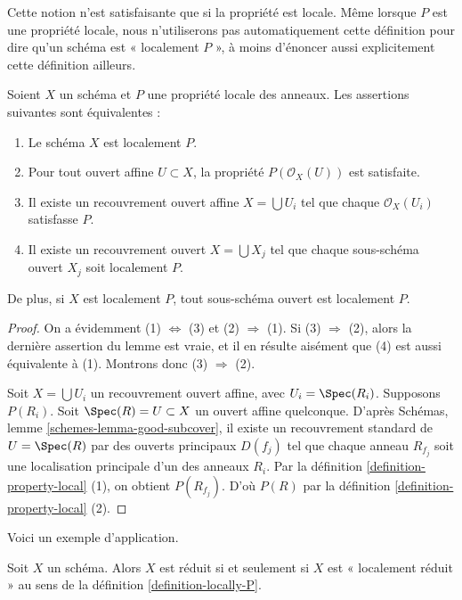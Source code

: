 \noindent
Cette notion n'est satisfaisante que si la propriété est locale.
Même lorsque $P$ est une propriété locale, nous n'utiliserons pas
automatiquement cette définition pour dire qu'un schéma est
« localement $P$ », à moins d'énoncer aussi explicitement cette définition
ailleurs.

\begin{lemma}
\label{lemma-locally-P}
Soient $X$ un schéma et $P$ une propriété locale des anneaux.
Les assertions suivantes sont équivalentes :
\begin{enumerate}
\item Le schéma $X$ est localement $P$.
\item Pour tout ouvert affine $U \subset X$, la propriété
$P(\mathcal{O}_X(U))$ est satisfaite.
\item Il existe un recouvrement ouvert affine $X = \bigcup U_i$ tel que
chaque $\mathcal{O}_X(U_i)$ satisfasse $P$.
\item Il existe un recouvrement ouvert $X = \bigcup X_j$
tel que chaque sous-schéma ouvert $X_j$ soit localement $P$.
\end{enumerate}
De plus, si $X$ est localement $P$, tout sous-schéma ouvert
est localement $P$.
\end{lemma}

\begin{proof}
On a évidemment (1) $\Leftrightarrow$ (3) et (2) $\Rightarrow$ (1).
Si (3) $\Rightarrow$ (2), alors la dernière assertion du lemme
est vraie, et il en résulte aisément que (4) est aussi équivalente à (1).
Montrons donc (3) $\Rightarrow$ (2).

\medskip\noindent
Soit $X = \bigcup U_i$ un recouvrement ouvert affine, avec
$U_i = \Spec(R_i)$. Supposons $P(R_i)$.
Soit $\Spec(R) = U \subset X$ un ouvert affine quelconque.
D'après Schémas, lemme \ref{schemes-lemma-good-subcover},
il existe un recouvrement standard de $U = \Spec(R)$ par des
ouverts principaux $D(f_j)$ tel que chaque anneau $R_{f_j}$ soit une
localisation principale d'un des anneaux $R_i$. Par la
définition \ref{definition-property-local} (1), on obtient $P(R_{f_j})$.
D'où $P(R)$ par la définition \ref{definition-property-local} (2).
\end{proof}

\noindent
Voici un exemple d'application.

\begin{lemma}
\label{lemma-reduced-is-locally-reduced}
Soit $X$ un schéma. Alors $X$ est réduit si et seulement si $X$ est
« localement réduit » au sens de la définition \ref{definition-locally-P}.
\end{lemma}

